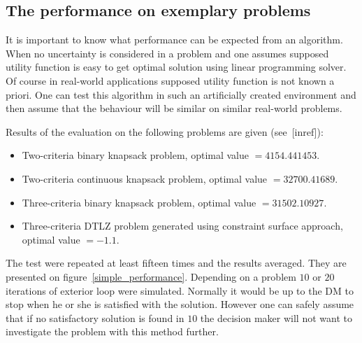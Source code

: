 \clearpage{}
\subsection{The performance on exemplary problems}
It is important to know what performance can be expected from an
algorithm. When no uncertainty is considered in a problem and one assumes
supposed utility function is easy to get optimal solution using linear
programming solver. Of course in real-world applications supposed utility
function is not known a priori. One can test this algorithm in such an
artificially created environment and then assume that the behaviour will be
similar on similar real-world problems.

Results of the evaluation on the following problems are given (see~[inref]):
\begin{itemize}
\item Two-criteria binary knapsack problem, optimal value $= 4154.441453$.
\item Two-criteria continuous knapsack problem, optimal value $= 32700.41689$.
\item Three-criteria binary knapsack problem, optimal value $= 31502.10927$.
\item Three-criteria DTLZ problem generated using constraint surface approach, optimal value $= -1.1$.
\end{itemize}

The test were repeated at least fifteen times and the results averaged. They
are presented on figure~\ref{simple_performance}. Depending on a problem $10$
or $20$ iterations of exterior loop were simulated. Normally it would be up to
the DM to stop when he or she is satisfied with the solution. However one can
safely assume that if no satisfactory solution is found in $10$ the decision
maker will not want to investigate the problem with this method further.

